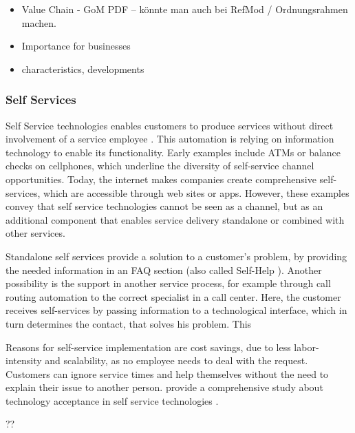 				
				\begin{itemize}
		
			\item Value Chain - GoM PDF -- könnte man auch bei RefMod / Ordnungsrahmen machen. 			
			\item Importance for businesses
			\item characteristics, developments 
		\end{itemize}
	
	\subsubsection{Self Services}
		Self Service technologies enables customers to produce services without direct involvement of a service employee \cite{meuter2000self}. This automation is relying on information technology to enable its functionality. Early examples include ATMs or balance checks on cellphones, which underline the diversity of self-service channel opportunities. Today, the internet makes companies create comprehensive self-services, which are accessible through web sites or apps. However, these examples convey that self service technologies cannot be seen as a channel, but as an additional component that enables service delivery standalone or combined with other services. 
		
		Standalone self services provide a solution to a customer's problem, \ie by providing the needed information in an \acrshort{FAQ} section (also called Self-Help \cite{meuter2000self}). Another possibility is the support in another service process, for example through call routing automation to the correct specialist in a call center. Here, the customer receives self-services by passing information to a technological interface, which in turn determines the contact, that solves his problem. This 
		
		Reasons for self-service implementation are cost savings, due to less labor-intensity and scalability, as no employee needs to deal with the request. Customers can ignore service times and help themselves without the need to explain their issue to another person. \citeauthor{Blut_2016} provide a comprehensive study about technology acceptance in self service technologies \cite{Blut_2016}. 
		
		??
		
		
